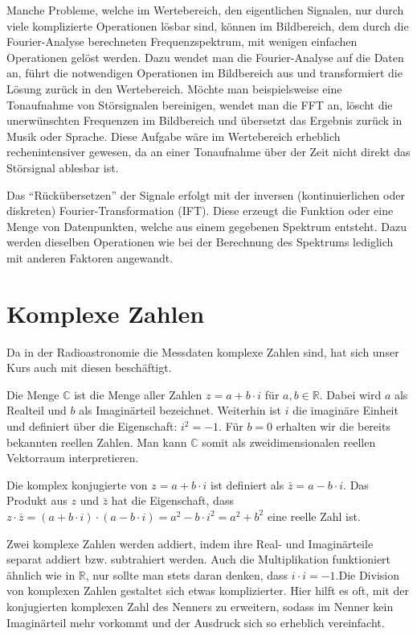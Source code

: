 \documentclass[]{dsadokumentation}
\begin{document}
Manche Probleme, welche im Wertebereich, den eigentlichen Signalen, nur durch viele komplizierte Operationen l\"osbar sind, k\"onnen im Bildbereich, dem durch die Fourier-Analyse berechneten Frequenzspektrum, mit wenigen einfachen Operationen gel\"ost werden. Dazu wendet man die Fourier-Analyse auf die Daten an, führt die notwendigen Operationen im Bildbereich aus und transformiert die Lösung zurück in den Wertebereich. Möchte man beispielsweise eine Tonaufnahme von Störsignalen bereinigen, wendet man die FFT an, löscht die unerwünschten Frequenzen im Bildbereich und übersetzt das Ergebnis zurück in Musik oder Sprache. Diese Aufgabe w\"are im Wertebereich erheblich rechenintensiver gewesen, da an einer Tonaufnahme über der Zeit nicht direkt das Störsignal ablesbar ist.

Das \enquote{Rückübersetzen} der Signale erfolgt mit der inversen (kontinuierlichen oder diskreten) Fourier-Transformation (IFT). Diese erzeugt die Funktion oder eine Menge von Datenpunkten, welche aus einem gegebenen Spektrum entsteht. Dazu werden dieselben Operationen wie bei der Berechnung des Spektrums lediglich mit anderen Faktoren angewandt.

\section{Komplexe Zahlen}
Da in der Radioastronomie die Messdaten komplexe Zahlen sind, hat sich unser Kurs auch mit diesen beschäftigt.

Die Menge $\mathbb{C}$ ist die Menge aller Zahlen $z=a+b\cdot i$ für $a, b \in \mathbb{R}$. Dabei wird $a$ als Realteil und $b$ als Imaginärteil bezeichnet. Weiterhin ist $i$ die imagin\"are Einheit und definiert über die Eigenschaft: $i^{2} = -1$. Für $b = 0$ erhalten wir die bereits bekannten reellen Zahlen. Man kann $\mathbb{C}$ somit als zweidimensionalen reellen Vektorraum interpretieren.

Die komplex konjugierte von $z=a+b\cdot i$ ist definiert als $\bar{z}=a-b\cdot i$. Das Produkt aus $z$ und $\bar{z}$ hat die Eigenschaft, dass $z\cdot \bar{z}=(a+b\cdot i)\cdot (a-b\cdot i)=a^2-b\cdot i^2=a^2+b^2$ eine reelle Zahl ist.

Zwei komplexe Zahlen werden addiert, indem ihre Real- und Imaginärteile separat addiert bzw. subtrahiert werden. Auch die Multiplikation funktioniert ähnlich wie in $\mathbb{R}$, nur sollte man stets daran denken, dass $i\cdot i=-1$.Die Division von komplexen Zahlen gestaltet sich etwas komplizierter. Hier hilft es oft, mit der konjugierten komplexen Zahl des Nenners zu erweitern, sodass im Nenner kein Imaginärteil mehr vorkommt und der Ausdruck sich so erheblich vereinfacht.
\end{document}
